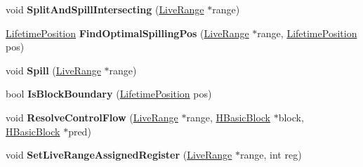 \begin{DoxyCompactItemize}
\item 
void {\bfseries Split\+And\+Spill\+Intersecting} (\hyperlink{classv8_1_1internal_1_1_live_range}{Live\+Range} $\ast$range)\hypertarget{classv8_1_1internal_1_1_b_a_s_e___e_m_b_e_d_d_e_d_acb4f5a52fefd8a0a238aa09b0cd7d0a0}{}\label{classv8_1_1internal_1_1_b_a_s_e___e_m_b_e_d_d_e_d_acb4f5a52fefd8a0a238aa09b0cd7d0a0}

\item 
\hyperlink{classv8_1_1internal_1_1_lifetime_position}{Lifetime\+Position} {\bfseries Find\+Optimal\+Spilling\+Pos} (\hyperlink{classv8_1_1internal_1_1_live_range}{Live\+Range} $\ast$range, \hyperlink{classv8_1_1internal_1_1_lifetime_position}{Lifetime\+Position} pos)\hypertarget{classv8_1_1internal_1_1_b_a_s_e___e_m_b_e_d_d_e_d_af6e1b035aba706bfec40ed603d1a92f5}{}\label{classv8_1_1internal_1_1_b_a_s_e___e_m_b_e_d_d_e_d_af6e1b035aba706bfec40ed603d1a92f5}

\item 
void {\bfseries Spill} (\hyperlink{classv8_1_1internal_1_1_live_range}{Live\+Range} $\ast$range)\hypertarget{classv8_1_1internal_1_1_b_a_s_e___e_m_b_e_d_d_e_d_a2ef7b5212567f9aa8b61930bfa778250}{}\label{classv8_1_1internal_1_1_b_a_s_e___e_m_b_e_d_d_e_d_a2ef7b5212567f9aa8b61930bfa778250}

\item 
bool {\bfseries Is\+Block\+Boundary} (\hyperlink{classv8_1_1internal_1_1_lifetime_position}{Lifetime\+Position} pos)\hypertarget{classv8_1_1internal_1_1_b_a_s_e___e_m_b_e_d_d_e_d_ad758ec6d3062d842091aad11ad16fdfc}{}\label{classv8_1_1internal_1_1_b_a_s_e___e_m_b_e_d_d_e_d_ad758ec6d3062d842091aad11ad16fdfc}

\item 
void {\bfseries Resolve\+Control\+Flow} (\hyperlink{classv8_1_1internal_1_1_live_range}{Live\+Range} $\ast$range, \hyperlink{classv8_1_1internal_1_1_h_basic_block}{H\+Basic\+Block} $\ast$block, \hyperlink{classv8_1_1internal_1_1_h_basic_block}{H\+Basic\+Block} $\ast$pred)\hypertarget{classv8_1_1internal_1_1_b_a_s_e___e_m_b_e_d_d_e_d_ace4c332992f624271c4f028d4ce7e34d}{}\label{classv8_1_1internal_1_1_b_a_s_e___e_m_b_e_d_d_e_d_ace4c332992f624271c4f028d4ce7e34d}

\item 
void {\bfseries Set\+Live\+Range\+Assigned\+Register} (\hyperlink{classv8_1_1internal_1_1_live_range}{Live\+Range} $\ast$range, int reg)\hypertarget{classv8_1_1internal_1_1_b_a_s_e___e_m_b_e_d_d_e_d_ab2f0f4526f83bcd706abce9e2d41e143}{}\label{classv8_1_1internal_1_1_b_a_s_e___e_m_b_e_d_d_e_d_ab2f0f4526f83bcd706abce9e2d41e143}


\end{DoxyCompactItemize}
